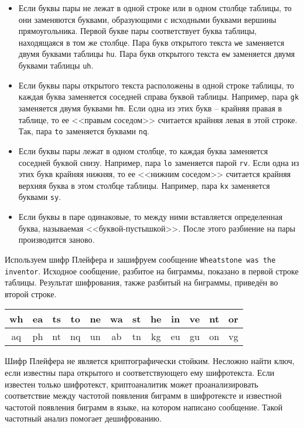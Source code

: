 \begin{itemize}
    \item Если буквы пары не лежат в одной строке или в одном столбце таблицы, то они заменяются буквами, образующими с исходными буквами вершины прямоугольника. Первой букве пары соответствует буква таблицы, находящаяся в том же столбце. Пара букв открытого текста \texttt{we} заменяется двумя буквами таблицы \texttt{hu}. Пара букв открытого текста \texttt{ew} заменяется двумя буквами таблицы \texttt{uh}.
    \item Если буквы пары открытого текста расположены в одной строке таблицы, то каждая буква заменяется соседней справа буквой таблицы. Например, пара \texttt{gk}  заменяется двумя буквами \texttt{hm}. Если одна из этих букв -- крайняя правая в таблице, то ее <<правым соседом>> считается крайняя левая в этой строке. Так, пара \texttt{to} заменяется буквами \texttt{nq}.
    \item Если буквы пары лежат в одном столбце, то каждая буква заменяется соседней буквой снизу. Например, пара \texttt{lo} заменяется парой \texttt{rv}. Если одна из этих букв крайняя нижняя, то ее <<нижним соседом>> считается крайняя верхняя буква в этом столбце таблицы. Например, пара \texttt{kx} заменяется буквами \texttt{sy}.
    \item Если буквы в паре одинаковые, то между ними вставляется определенная буква, называемая <<буквой-пустышкой>>. После этого разбиение на пары производится заново.
\end{itemize}

\example
Используем шифр Плейфера и зашифруем сообщение \texttt{Wheatstone was the inventor}. Исходное сообщение, разбитое на биграммы, показано в первой строке таблицы. Результат шифрования, также разбитый на биграммы, приведён во второй строке.
\begin{center} \begin{tabular}{|*{12}c|}
    \hline
    wh & ea & ts & to & ne & wa & st & he & in & ve & nt & or \\
    \hline
    aq & ph & nt & nq & un & ab & tn & kg & eu & gu & on & vg \\
    \hline
\end{tabular} \end{center}
\exampleend

Шифр Плейфера не является криптографически стойким. Несложно найти ключ, если известны пара открытого и соответствующего ему шифротекста. Если известен только шифротекст, криптоаналитик может проанализировать соответствие между частотой появления биграмм в шифротексте и известной частотой появления биграмм в языке, на котором написано сообщение. Такой частотный анализ помогает дешифрованию.
